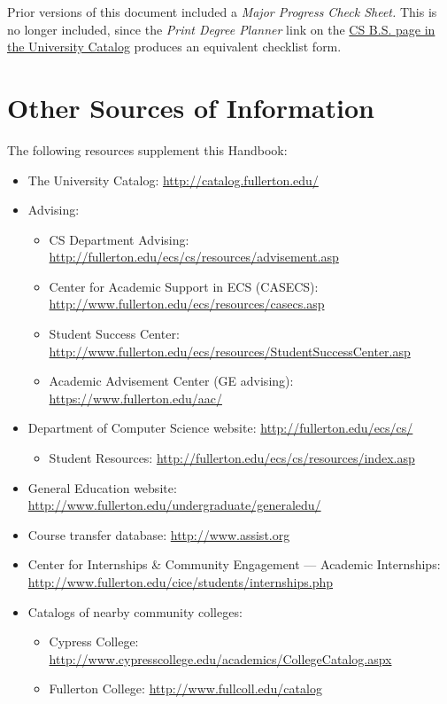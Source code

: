 \documentclass{book}
\begin{document}
Prior versions of this document included a \emph{Major Progress Check Sheet.} This is no longer included, since the \emph{Print Degree Planner} link on the \href{http://catalog.fullerton.edu/preview_program.php?catoid=2&poid=537&returnto=137}{CS B.S. page in the University Catalog} produces an equivalent checklist form.

\chapter{Other Sources of Information}

The following resources supplement this Handbook:
\begin{itemize}
\item The University Catalog: \url{http://catalog.fullerton.edu/}
\item Advising:
  \begin{itemize}
    \item CS Department Advising: \url{http://fullerton.edu/ecs/cs/resources/advisement.asp}
  \item Center for Academic Support in ECS (CASECS): \url{http://www.fullerton.edu/ecs/resources/casecs.asp}
  \item Student Success Center: \url{http://www.fullerton.edu/ecs/resources/StudentSuccessCenter.asp}
    \item Academic Advisement Center (GE advising): \url{https://www.fullerton.edu/aac/}
    \end{itemize}
\item Department of Computer Science website: \url{http://fullerton.edu/ecs/cs/}
  \begin{itemize}
  \item Student Resources: \url{http://fullerton.edu/ecs/cs/resources/index.asp}
  \end{itemize}
\item General Education website: \url{http://www.fullerton.edu/undergraduate/generaledu/}
\item Course transfer database: \url{http://www.assist.org}
\item Center for Internships \& Community Engagement --- Academic Internships: \url{http://www.fullerton.edu/cice/students/internships.php}
\item Catalogs of nearby community colleges:
  \begin{itemize}
    \item Cypress College: \url{http://www.cypresscollege.edu/academics/CollegeCatalog.aspx}
    \item Fullerton College: \url{http://www.fullcoll.edu/catalog}

\end{itemize}
\end{itemize}
\end{document}
